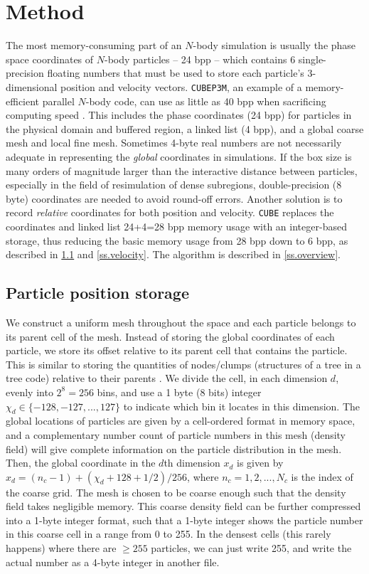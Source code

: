 \documentclass[10pt,twocolumn,reprint]{emulateapj}
\begin{document}
\section{Method}\label{s.method}
The most memory-consuming part of an $N$-body simulation is usually the phase space coordinates of $N$-body particles -- 24 bpp -- which contains 6 single-precision floating numbers that must be used to store each particle's 3-dimensional position and velocity vectors. {\tt CUBEP3M}, an example of a memory-efficient parallel $N$-body code, can use as little as 40 bpp when sacrificing computing speed \citep{2013MNRAS.436..540H}. This includes the phase coordinates (24 bpp) for particles in the physical domain and buffered region, a linked list (4 bpp), and a global coarse mesh and local fine mesh. Sometimes 4-byte real numbers are not necessarily adequate in representing the {\it global} coordinates in simulations. If the box size is many orders of magnitude larger than the interactive distance between particles, especially in the field of resimulation of dense subregions, double-precision (8 byte) coordinates are needed to avoid round-off errors. Another solution is to record {\it relative} coordinates for both position and velocity. {\tt CUBE} replaces the coordinates and linked list 24+4=28 bpp memory usage with an integer-based storage, thus reducing the basic memory usage from 28 bpp down to 6 bpp, as described in \ref{ss.position} and \ref{ss.velocity}. The algorithm is described in \ref{ss.overview}.

\subsection{Particle position storage}\label{ss.position}
We construct a uniform mesh throughout the space and each particle belongs to its parent cell of the mesh. Instead of storing the global coordinates of each particle, we store its offset relative to its parent cell that contains the particle. This is similar to storing the quantities of nodes/clumps (structures of a tree in a tree code) relative to their parents \citep{1985SJSSC...6...85A}. We divide the cell, in each dimension $d$, evenly into $2^8=256$ bins, and use a 1 byte (8 bits) integer $\chi_d \in \{-128,-127,...,127\}$ to indicate which bin it locates in this dimension. The global locations of particles are given by a cell-ordered format in memory space, and a complementary number count of particle numbers in this mesh (density field) will give complete information on the particle distribution in the mesh. Then, the global coordinate in the $d$th dimension $x_d$ is given by $x_d=(n_c-1)+(\chi_d+128+1/2)/256$, where $n_c=1,2,...,N_c$ is the index of the coarse grid. The mesh is chosen to be coarse enough such that the density field takes negligible memory. This coarse density field can be further compressed into a 1-byte integer format, such that a 1-byte integer shows the particle number in this coarse cell in a range from 0 to 255. In the densest cells (this rarely happens) where there are $\ge 255$ particles, we can just write 255, and write the actual number as a 4-byte integer in another file.
\end{document}
